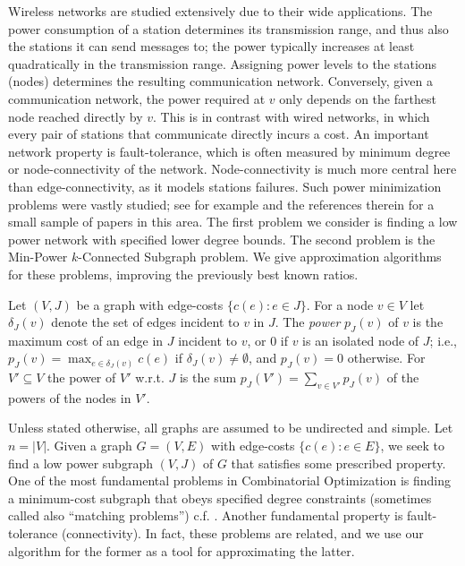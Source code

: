 \documentclass{llncs}
\begin{document}
Wireless networks are studied extensively due to their wide applications. 
The power consumption of a station determines its transmission range, and thus also 
the stations it can send messages to; the power typically increases at least
quadratically in the transmission range. Assigning power levels to
the stations (nodes) determines the resulting communication network.
Conversely, given a communication network, the power required at $v$
only depends on the farthest node reached directly by $v$.
This is in contrast with wired networks, in which every pair of stations 
that communicate directly incurs a cost. 
An important network property is fault-tolerance, which is often measured
by minimum degree or node-connectivity of the network.
Node-connectivity is much more central here than edge-connectivity,
as it models stations failures. Such power minimization problems were vastly studied;
see for example \cite{ACMP,HKMN,LYN,N-dir,zeev-p} and the references therein for 
a small sample of papers in this area.
The first problem we consider is finding a low power network with 
specified lower degree bounds.
The second problem is the {\sf Min-Power $k$-Connected Subgraph} problem. 
We give approximation algorithms for these problems,
improving the previously best known ratios.


\begin{definition}
Let $(V,J)$ be a graph with edge-costs $\{c(e):e \in J\}$.
For a node $v \in V$ let $\delta_J(v)$ denote the set of edges incident to $v$ in $J$.
The {\em power} $p_J(v)$ of $v$ is the maximum cost of an edge in $J$ incident to $v$, 
or $0$ if $v$ is an isolated node of $J$;
i.e., $p_J(v) = \max_{e \in \delta_J(v)} c(e)$ if $\delta_J(v) \neq \emptyset$,
and $p_J(v)=0$ otherwise. For $V' \subseteq V$ the power of $V'$ w.r.t. $J$ 
is the sum $p_J(V')=\sum_{v \in V'} p_J(v)$ of the powers of the nodes in $V'$.
\end{definition}

Unless stated otherwise, all graphs are assumed to be undirected and simple.
Let $n=|V|$. 
Given a graph $G=(V,E)$ with edge-costs $\{c(e):e \in E\}$, 
we seek to find a low power subgraph $(V,J)$ of $G$ that satisfies some prescribed property.
One of the most fundamental problems in Combinatorial Optimization is finding 
a minimum-cost subgraph that obeys specified degree constraints 
(sometimes called also ``matching problems'') c.f. \cite{Sch}.
Another fundamental property is fault-tolerance (connectivity).
In fact, these problems are related, and we use our algorithm 
for the former as a tool for approximating the latter.
\end{document}
